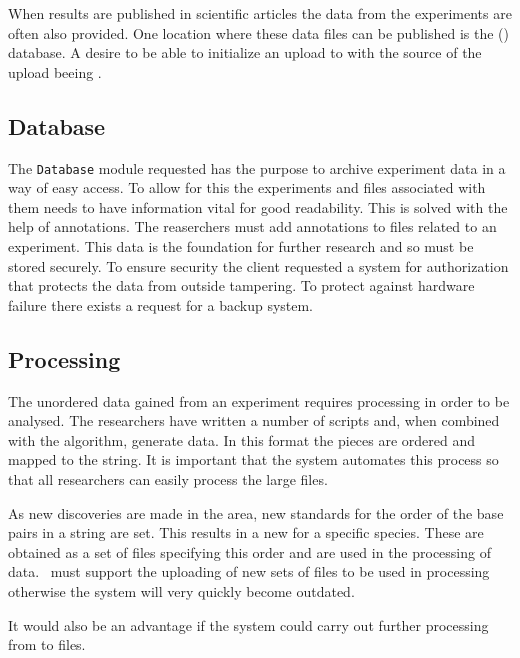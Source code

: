 When results are published in scientific articles the  data from the experiments are often also provided. One location where these  data files can be published is the  () database. A desire to be able to initialize an upload to \appName with the source of the upload beeing  .

\subsection{Database}
The \texttt{Database} module requested has the purpose to archive experiment data in a way of easy access. To allow for this the experiments and files associated with them needs to have information vital for good readability. This is solved with the help of annotations. The reaserchers must add annotations to files related to an experiment.
This data is the foundation for further research and so must be stored securely. To ensure security the client requested a system for authorization that protects the data from outside tampering. To protect against hardware failure there exists a request for a backup system.

\subsection{Processing}
The unordered  data gained from an experiment requires processing in order to be analysed. The researchers have written a number of scripts and, when combined with the  algorithm, generate  data. In this format the  pieces are ordered and mapped to the  string. It is important that the system automates this process so that all researchers can easily process the large  files.

As new discoveries are made in the area, new standards for the order of the base pairs in a  string are set. This results in a new  for a specific species. These are obtained as a set of files specifying this order and are used in the processing of  data. \appName\ must support the uploading of new sets of  files to be used in processing otherwise the system will very quickly become outdated. 

It would also be an advantage if the system could carry out further processing from  to  files.

